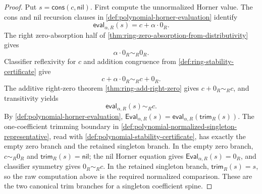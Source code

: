 \begin{proof}
Put $s=\mathsf{cons}(c,\mathsf{nil})$. First compute the unnormalized Horner value. The cons and nil recursion clauses in \autoref{def:polynomial-horner-evaluation} identify
$$
\mathsf{eval}_{\alpha,R}(s)=c+\alpha\cdot0_R.
$$
The right zero-absorption half of \autoref{thm:ring-zero-absorption-from-distributivity} gives
$$
\alpha\cdot0_R\sim_R0_R.
$$
Classifier reflexivity for $c$ and addition congruence from \autoref{def:ring-stability-certificate} give
$$
c+\alpha\cdot0_R\sim_Rc+0_R.
$$
The additive right-zero theorem \autoref{thm:ring-add-right-zero} gives $c+0_R\sim_Rc$, and transitivity yields
$$
\mathsf{eval}_{\alpha,R}(s)\sim_Rc.
$$
By \autoref{def:polynomial-horner-evaluation}, $\mathsf{Eval}_{\alpha,R}(s)=\mathsf{eval}_{\alpha,R}(\mathsf{trim}_R(s))$. The one-coefficient trimming boundary in \autoref{def:polynomial-normalized-singleton-representative}, read with \autoref{def:polynomial-stability-certificate}, has exactly the empty zero branch and the retained singleton branch. In the empty zero branch, $c\sim_R0_R$ and $\mathsf{trim}_R(s)=\mathsf{nil}$; the nil Horner equation gives $\mathsf{Eval}_{\alpha,R}(s)=0_R$, and classifier symmetry gives $0_R\sim_Rc$. In the retained singleton branch, $\mathsf{trim}_R(s)=s$, so the raw computation above is the required normalized comparison. These are the two canonical trim branches for a singleton coefficient spine.
\end{proof}

